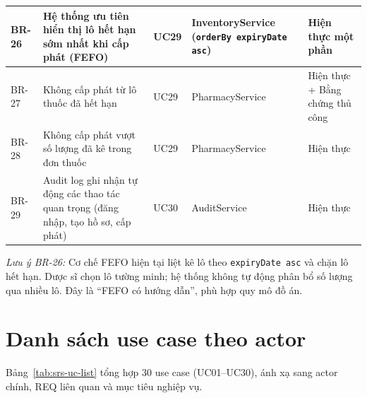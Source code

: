 \begin{longtable}{|p{1.3cm}|p{4.5cm}|p{2.0cm}|p{2.4cm}|p{2.2cm}|}
\hline
BR-26 & Hệ thống ưu tiên hiển thị lô hết hạn sớm nhất khi cấp phát (FEFO) & UC29 & InventoryService (\texttt{orderBy expiryDate asc}) & Hiện thực một phần \\
\hline
BR-27 & Không cấp phát từ lô thuốc đã hết hạn & UC29 & PharmacyService & Hiện thực + Bằng chứng thủ công \\
\hline
BR-28 & Không cấp phát vượt số lượng đã kê trong đơn thuốc & UC29 & PharmacyService & Hiện thực \\
\hline
BR-29 & Audit log ghi nhận tự động các thao tác quan trọng (đăng nhập, tạo hồ sơ, cấp phát) & UC30 & AuditService & Hiện thực \\
\hline
\end{longtable}

\textit{Lưu ý BR-26:} Cơ chế FEFO hiện tại liệt kê lô theo \texttt{expiryDate asc} và chặn lô hết hạn. Dược sĩ chọn lô tường minh; hệ thống không tự động phân bổ số lượng qua nhiều lô. Đây là ``FEFO có hướng dẫn'', phù hợp quy mô đồ án.

\section{Danh sách use case theo actor}
\label{sec:srs-uc-list}

Bảng~\ref{tab:srs-uc-list} tổng hợp 30 use case (UC01--UC30), ánh xạ sang actor chính, REQ liên quan và mục tiêu nghiệp vụ.

